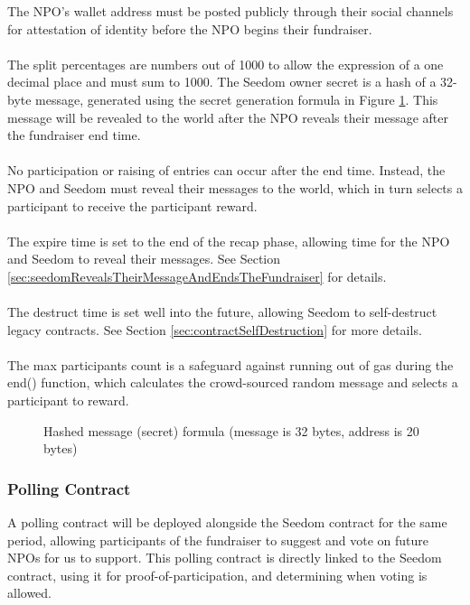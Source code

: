 \documentclass[11pt]{article}
\begin{document}
The NPO's wallet address must be posted publicly through their social channels for attestation of identity before the NPO begins their fundraiser.\\\\
The split percentages are numbers out of 1000 to allow the expression of a one decimal place and must sum to 1000. The Seedom owner secret is a hash of a 32-byte message, generated using the secret generation formula in Figure \ref{figure:secretGenerationFormula}. This message will be revealed to the world after the NPO reveals their message after the fundraiser end time.\\\\
No participation or raising of entries can occur after the end time. Instead, the NPO and Seedom must reveal their messages to the world, which in turn selects a participant to receive the participant reward.\\\\
The expire time is set to the end of the recap phase, allowing time for the NPO and Seedom to reveal their messages. See Section \ref{sec:seedomRevealsTheirMessageAndEndsTheFundraiser} for details.\\\\
The destruct time is set well into the future, allowing Seedom to self-destruct legacy contracts. See Section \ref{sec:contractSelfDestruction} for more details.\\\\
The max participants count is a safeguard against running out of gas during the end() function, which calculates the crowd-sourced random message and selects a participant to reward.

\begin{figure}[H]
\begin{center}
\caption{Hashed message (secret) formula (message is 32 bytes, address is 20 bytes)}
\label{figure:secretGenerationFormula}
\end{center}
\end{figure}

\subsubsection{Polling Contract}

A polling contract will be deployed alongside the Seedom contract for the same period, allowing participants of the fundraiser to suggest and vote on future NPOs for us to support. This polling contract is directly linked to the Seedom contract, using it for proof-of-participation, and determining when voting is allowed.
\end{document}
